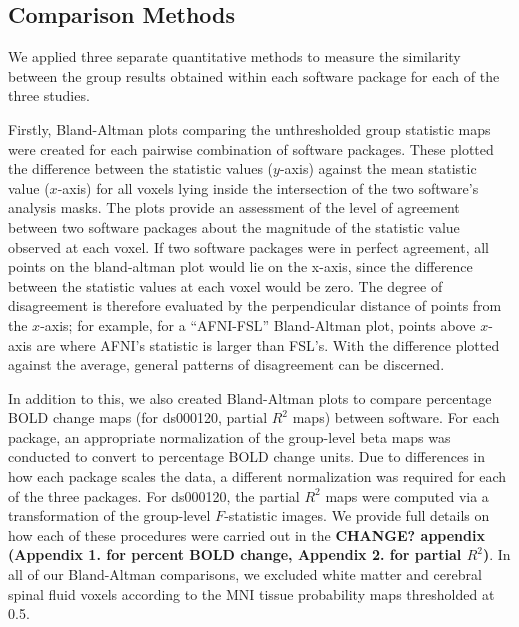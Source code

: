 \subsection{Comparison Methods}

We applied three separate quantitative methods to measure the similarity between the group results obtained within each software package for each of the three studies. 

Firstly, Bland-Altman plots comparing the unthresholded group statistic maps were created for each pairwise combination of software packages. These plotted the difference between the statistic values ($y$-axis) against the mean statistic value ($x$-axis) for all voxels lying inside the intersection of the two software's analysis masks. The plots provide an assessment of the level of agreement between two software packages about the magnitude of the statistic value observed at each voxel. If two software packages were in perfect agreement, all points on the bland-altman plot would lie on the x-axis, since the difference between the statistic values at each voxel would be zero. The degree of disagreement is therefore evaluated by the perpendicular distance of points from the $x$-axis; for example, for a ``AFNI-FSL'' Bland-Altman plot, points above $x$-axis are where AFNI's statistic is larger than FSL's. With the difference plotted against the average, general patterns of disagreement can be discerned.

In addition to this, we also created Bland-Altman plots to compare percentage BOLD change maps (for ds000120, partial $R^{2}$ maps) between software. For each package, an appropriate normalization of the group-level beta maps was conducted to convert to percentage BOLD change units. Due to differences in how each package scales the data, a different normalization was required for each of the three packages. For ds000120, the partial $R^{2}$ maps were computed via a transformation of the group-level $F$-statistic images. We provide full details on how each of these procedures were carried out in the \textbf{CHANGE? appendix (Appendix 1. for percent BOLD change, Appendix 2. for partial $R^{2}$)}. In all of our Bland-Altman comparisons, we excluded white matter and cerebral spinal fluid voxels according to the MNI tissue probability maps thresholded at 0.5. 

